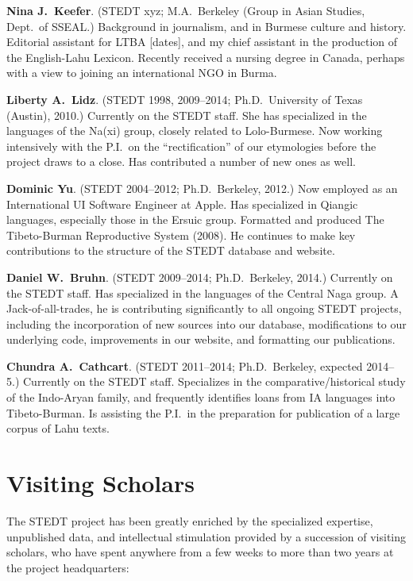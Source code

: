 \textbf{Nina J.\ Keefer}. (STEDT xyz; M.A.\ Berkeley (Group in Asian Studies, Dept.\ of SSEAL.) Background in journalism, and in Burmese culture and history. Editorial assistant for LTBA [dates], and my chief assistant in the production of the English-Lahu Lexicon. Recently received a nursing degree in Canada, perhaps with a view to joining an international NGO in Burma.

\textbf{Liberty A.\ Lidz}. (STEDT 1998, 2009–2014; Ph.D.\ University of Texas (Austin), 2010.) Currently on the STEDT staff. She has specialized in the languages of the Na(xi) group, closely related to Lolo-Burmese. Now working intensively with the P.I.\ on the “rectification” of our etymologies before the project draws to a close. Has contributed a number of new ones as well.

\textbf{Dominic Yu}. (STEDT 2004–2012; Ph.D.\ Berkeley, 2012.) Now employed as an International UI Software Engineer at Apple. Has specialized in Qiangic languages, especially those in the Ersuic group. Formatted and produced The Tibeto-Burman Reproductive System (2008). He continues to make key contributions to the structure of the STEDT database and website.

\textbf{Daniel W.\ Bruhn}. (STEDT 2009–2014; Ph.D.\ Berkeley, 2014.) Currently on the STEDT staff. Has specialized in the languages of the Central Naga group. A Jack-of-all-trades, he is contributing significantly to all ongoing STEDT projects, including the incorporation of new sources into our database, modifications to our underlying code, improvements in our website, and formatting our publications.

\textbf{Chundra A.\ Cathcart}. (STEDT 2011–2014; Ph.D.\ Berkeley, expected 2014–5.) Currently on the STEDT staff. Specializes in the comparative/historical study of the Indo-Aryan family, and frequently identifies loans from IA languages into Tibeto-Burman. Is assisting the P.I.\ in the preparation for publication of a large corpus of Lahu texts.

\section{Visiting Scholars}

The STEDT project has been greatly enriched by the specialized expertise, unpublished data, and intellectual stimulation provided by a succession of visiting scholars, who have spent anywhere from a few weeks to more than two years at the project headquarters: 


